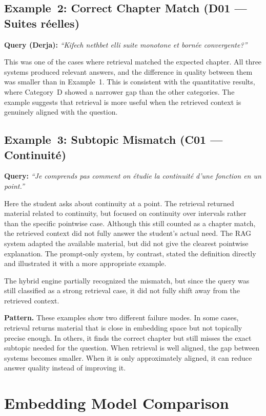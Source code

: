 \subsection{Example~2: Correct Chapter Match (D01 --- Suites réelles)}

\noindent\textbf{Query (Derja):} \textit{``Kifech nethbet elli suite
monotone et bornée convergente?''}

This was one of the cases where retrieval matched the expected chapter.
All three systems produced relevant answers, and the difference in quality
between them was smaller than in Example~1. This is consistent with the
quantitative results, where Category~D showed a narrower gap than the other
categories. The example suggests that retrieval is more useful when the
retrieved context is genuinely aligned with the question.

\subsection{Example~3: Subtopic Mismatch (C01 --- Continuité)}

\noindent\textbf{Query:} \textit{``Je comprends pas comment on étudie la
continuité d'une fonction en un point.''}

Here the student asks about continuity at a point. The retrieval returned
material related to continuity, but focused on continuity over intervals
rather than the specific pointwise case. Although this still counted as a
chapter match, the retrieved context did not fully answer the student's
actual need. The RAG system adapted the available material, but did not give
the clearest pointwise explanation. The prompt-only system, by contrast,
stated the definition directly and illustrated it with a more appropriate
example.

The hybrid engine partially recognized the mismatch, but since the query was
still classified as a strong retrieval case, it did not fully shift away
from the retrieved context.

\textbf{Pattern.} These examples show two different failure modes. In some
cases, retrieval returns material that is close in embedding space but not
topically precise enough. In others, it finds the correct chapter but still
misses the exact subtopic needed for the question. When retrieval is well
aligned, the gap between systems becomes smaller. When it is only
approximately aligned, it can reduce answer quality instead of improving it.
\section{Embedding Model Comparison}
\label{sec:embedding-comparison}


